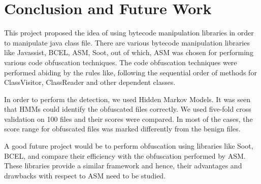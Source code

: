 \chapter{Conclusion and Future Work}

This project proposed the idea of using bytecode manipulation libraries in order to manipulate java class file. There are various bytecode manipulation libraries like Javassist, BCEL, ASM, Soot, out of which, ASM was chosen for performing various code obfuscation techniques. The code obfuscation techniques were performed abiding by the rules like, following the sequential order of methods for ClassVisitor, ClassReader and other dependent classes. 

In order to perform the detection, we used Hidden Markov Models. It was seen that HMMs could identify the obfuscated files correctly. We used five-fold cross validation on 100 files and their scores were compared. In most of the cases, the score range for obfuscated files was marked differently from the benign files.

A good future project would be to perform obfuscation using libraries like Soot, BCEL, and compare their efficiency with the obfuscation performed by ASM. These libraries provide a similar framework and hence, their advantages and drawbacks with respect to ASM need to be studied.
